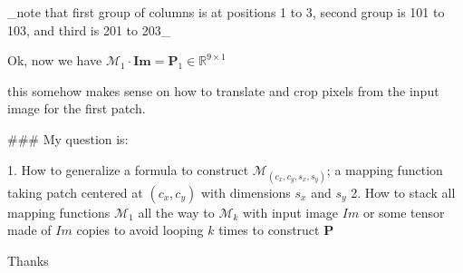 _note that first group of columns is at positions 1 to 3, second group is 101 to 103, and third is 201 to 203_

Ok, now we have $\mathcal{M}_1 \cdot \mathbf{Im} = \mathbf{P}_1 \in \mathbb{R}^{9 \times 1}$ 

this somehow makes sense on how to translate and crop pixels from the input image for the first patch.

### My question is:

1. How to generalize a formula to construct $\mathcal{M}_{(c_x, c_y, s_x, s_y)}$; a mapping function taking patch centered at $(c_x, c_y)$ with dimensions $s_x$ and $s_y$
2. How to stack all mapping functions $\mathcal{M}_1$ all the way to $\mathcal{M}_k$ with input image $Im$ or some tensor made of $Im$ copies to avoid looping $k$ times to construct $\mathbf{P}$

Thanks 
